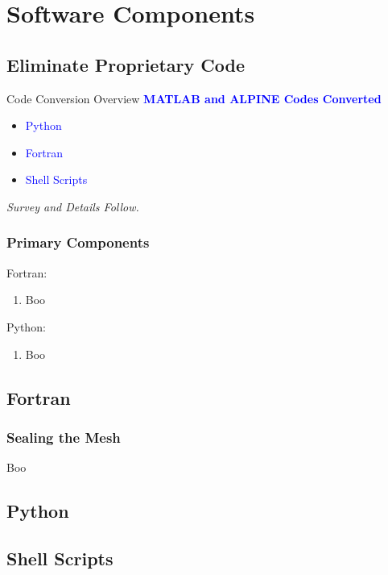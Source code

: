 % 

\section{Software Components}

\subsection{Eliminate Proprietary Code}
\begin{frame}{Code Conversion Overview}
    \centering
    \textcolor{blue}{\textbf{MATLAB and ALPINE Codes Converted}} \\[1em]

    \begin{itemize}
        \item \textcolor{blue}{Python} \\
        \item \textcolor{blue}{Fortran} \\
        \item \textcolor{blue}{Shell Scripts}
    \end{itemize}

    \vspace{1em}
    \textit{Survey and Details Follow.}
\end{frame}
\begin{frame}\frametitle{Primary Components}
Fortran:
\begin{enumerate}
	\item Boo
\end{enumerate}

Python:
\begin{enumerate}
	\item Boo
\end{enumerate}

\end{frame}

\subsection{Fortran}
\begin{frame}\frametitle{Sealing the Mesh}
Boo
\end{frame}


\subsection{Python}
	
\subsection{Shell Scripts}

\endinput  %
